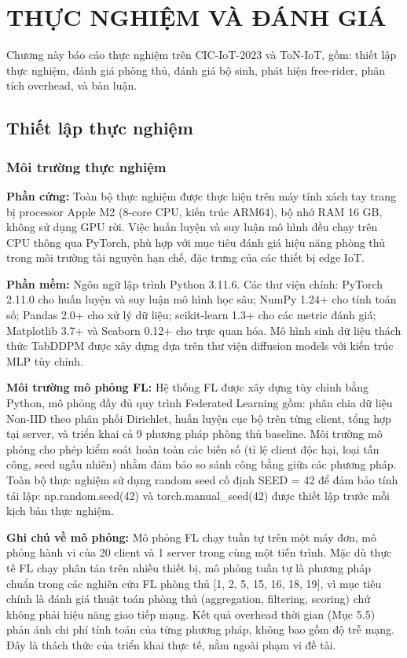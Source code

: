 \chapter{THỰC NGHIỆM VÀ ĐÁNH GIÁ}
\label{Chapter5}

Chương này báo cáo thực nghiệm trên CIC-IoT-2023 và ToN-IoT, gồm: thiết lập thực nghiệm, đánh giá phòng thủ, đánh giá bộ sinh, phát hiện free-rider, phân tích overhead, và bàn luận.

\section{Thiết lập thực nghiệm}

\subsection{Môi trường thực nghiệm}
\textbf{Phần cứng:} Toàn bộ thực nghiệm được thực hiện trên máy tính xách tay trang bị processor Apple M2 (8-core CPU, kiến trúc ARM64), bộ nhớ RAM 16 GB, không sử dụng GPU rời. Việc huấn luyện và suy luận mô hình đều chạy trên CPU thông qua PyTorch, phù hợp với mục tiêu đánh giá hiệu năng phòng thủ trong môi trường tài nguyên hạn chế, đặc trưng của các thiết bị edge IoT.

\textbf{Phần mềm:} Ngôn ngữ lập trình Python 3.11.6. Các thư viện chính: PyTorch 2.11.0 cho huấn luyện và suy luận mô hình học sâu; NumPy 1.24+ cho tính toán số; Pandas 2.0+ cho xử lý dữ liệu; scikit-learn 1.3+ cho các metric đánh giá; Matplotlib 3.7+ và Seaborn 0.12+ cho trực quan hóa. Mô hình sinh dữ liệu thách thức TabDDPM được xây dựng dựa trên thư viện diffusion models với kiến trúc MLP tùy chỉnh.

\textbf{Môi trường mô phỏng FL:} Hệ thống FL được xây dựng tùy chỉnh bằng Python, mô phỏng đầy đủ quy trình Federated Learning gồm: phân chia dữ liệu Non-IID theo phân phối Dirichlet, huấn luyện cục bộ trên từng client, tổng hợp tại server, và triển khai cả 9 phương pháp phòng thủ baseline. Môi trường mô phỏng cho phép kiểm soát hoàn toàn các biến số (tỉ lệ client độc hại, loại tấn công, seed ngẫu nhiên) nhằm đảm bảo so sánh công bằng giữa các phương pháp. Toàn bộ thực nghiệm sử dụng random seed cố định SEED = 42 để đảm bảo tính tái lập: np.random.seed(42) và torch.manual\_seed(42) được thiết lập trước mỗi kịch bản thực nghiệm.

\textbf{Ghi chú về mô phỏng:} Mô phỏng FL chạy tuần tự trên một máy đơn, mô phỏng hành vi của 20 client và 1 server trong cùng một tiến trình. Mặc dù thực tế FL chạy phân tán trên nhiều thiết bị, mô phỏng tuần tự là phương pháp chuẩn trong các nghiên cứu FL phòng thủ {[}1, 2, 5, 15, 16, 18, 19{]}, vì mục tiêu chính là đánh giá thuật toán phòng thủ (aggregation, filtering, scoring) chứ không phải hiệu năng giao tiếp mạng. Kết quả overhead thời gian (Mục 5.5) phản ánh chi phí tính toán của từng phương pháp, không bao gồm độ trễ mạng. Đây là thách thức của triển khai thực tế, nằm ngoài phạm vi đề tài.

